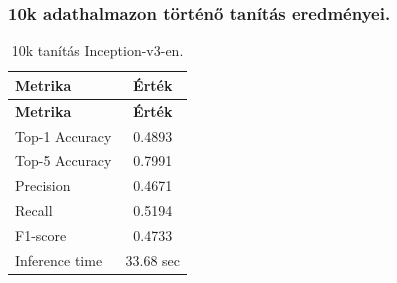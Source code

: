 \subsubsection{10k adathalmazon történő tanítás eredményei.}
  \begin{center}
    \begin{longtable}{l c}
    \caption{10k tanítás Inception-v3-en.} \label{tab:phase03_Inception-v3_10k} \\
    \toprule
    \textbf{Metrika} & \textbf{Érték} \\
    \midrule
    \endfirsthead
    \toprule
    \textbf{Metrika} & \textbf{Érték} \\
    \midrule
    \endhead
    Top-1 Accuracy & 0.4893 \\
    Top-5 Accuracy & 0.7991 \\
    Precision      & 0.4671 \\
    Recall         & 0.5194 \\
    F1-score       & 0.4733 \\
    Inference time & 33.68 sec \\
    \bottomrule
    \end{longtable}
  \end{center}

